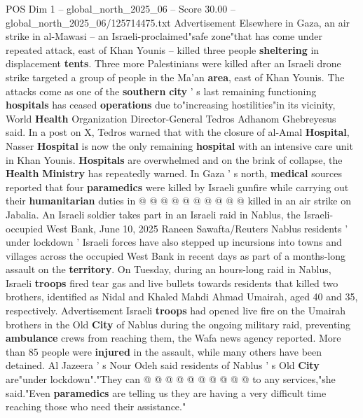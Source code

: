 \begin{textsample}{POS Dim 1 – global\_north\_2025\_06 – Score 30.00 – global\_north\_2025\_06/125714475.txt}
Advertisement Elsewhere in Gaza, an air strike in al-Mawasi -- an Israeli-proclaimed"safe zone"that has come under repeated attack, east of Khan Younis -- killed three people \textbf{sheltering} in displacement \textbf{tents}.
Three more Palestinians were killed after an Israeli drone strike targeted a group of people in the Ma'an \textbf{area}, east of Khan Younis.
The attacks come as one of the \textbf{southern} \textbf{city} ' s last remaining functioning \textbf{hospitals} has ceased \textbf{operations} due to"increasing hostilities"in its vicinity, World \textbf{Health} Organization Director-General Tedros Adhanom Ghebreyesus said.
In a post on X, Tedros warned that with the closure of al-Amal \textbf{Hospital}, Nasser \textbf{Hospital} is now the only remaining \textbf{hospital} with an intensive care unit in Khan Younis. \textbf{Hospitals} are overwhelmed and on the brink of collapse, the \textbf{Health} \textbf{Ministry} has repeatedly warned.
In Gaza ' s north, \textbf{medical} sources reported that four \textbf{paramedics} were killed by Israeli gunfire while carrying out their \textbf{humanitarian} duties in @ @ @ @ @ @ @ @ @ @ killed in an air strike on Jabalia.
An Israeli soldier takes part in an Israeli raid in Nablus, the Israeli-occupied West Bank, June 10, 2025 Raneen Sawafta/Reuters Nablus residents ' under lockdown ' Israeli forces have also stepped up incursions into towns and villages across the occupied West Bank in recent days as part of a months-long assault on the \textbf{territory}.
On Tuesday, during an hours-long raid in Nablus, Israeli \textbf{troops} fired tear gas and live bullets towards residents that killed two brothers, identified as Nidal and Khaled Mahdi Ahmad Umairah, aged 40 and 35, respectively.
Advertisement Israeli \textbf{troops} had opened live fire on the Umairah brothers in the Old \textbf{City} of Nablus during the ongoing military raid, preventing \textbf{ambulance} crews from reaching them, the Wafa news agency reported.
More than 85 people were \textbf{injured} in the assault, while many others have been detained.
Al Jazeera ' s Nour Odeh said residents of Nablus ' s Old \textbf{City} are"under lockdown"."They can @ @ @ @ @ @ @ @ @ @ to any services,"she said."Even \textbf{paramedics} are telling us they are having a very difficult time reaching those who need their assistance."

\end{textsample}
